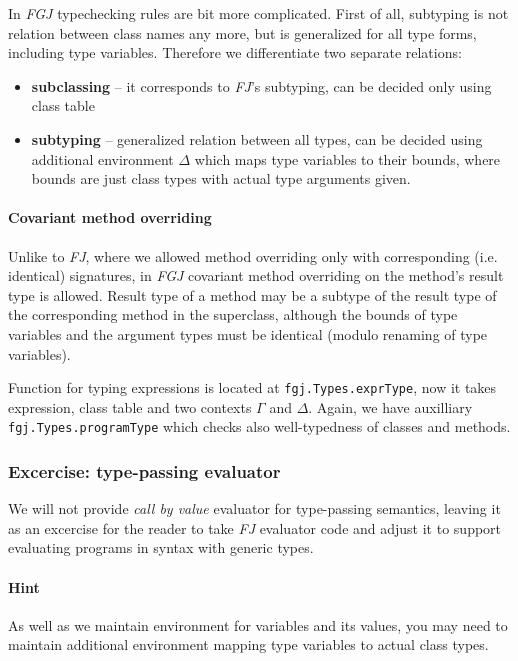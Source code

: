 \documentclass{article}[12pt]
\begin{document}
In \emph{FGJ} typechecking rules are bit more complicated. First
of all, subtyping is not relation between class names any more,
but is generalized for all type forms, including type variables.
Therefore we differentiate two separate relations:

\begin{itemize}
\item{\textbf{subclassing}} -- it corresponds to \emph{FJ}'s
  subtyping, can be decided only using class table
\item{\textbf{subtyping}} -- generalized relation between all
  types, can be decided using additional environment $\Delta$
  which maps type variables to their bounds, where bounds are
  just class types with actual type arguments given.
\end{itemize}

\paragraph{Covariant method overriding}

Unlike to \emph{FJ}, where we allowed method overriding only with
corresponding (i.e. identical) signatures, in \emph{FGJ} covariant
method overriding on the method's result type is allowed. Result
type of a method may be a subtype of the result type of the
corresponding method in the superclass, although the bounds of
type variables and the argument types must be identical (modulo
renaming of type variables).

Function for typing expressions is located at
\texttt{fgj.Types.exprType}, now it takes expression, class table
and two contexts $\Gamma$ and $\Delta$. Again, we have auxilliary
\texttt{fgj.Types.programType} which checks also well-typedness of
classes and methods.

\subsubsection{Excercise: type-passing evaluator}

We will not provide \emph{call by value} evaluator for type-passing
semantics, leaving it as an excercise for the reader to take
\emph{FJ} evaluator code and adjust it to support evaluating
programs in syntax with generic types.

\paragraph{Hint} As well as we maintain environment for variables
and its values, you may need to maintain additional environment
mapping type variables to actual class types.
\end{document}

